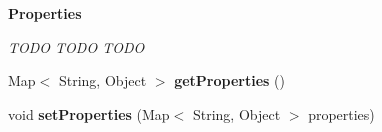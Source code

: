 \begin{Indent}{\bf Properties}\par
{\em \label{_amgrp9fc2d28c05ed9eb1d75ba4465abf15a9}
 TODO TODO TODO }\begin{DoxyCompactItemize}
\item 
\hypertarget{classcom_1_1janrain_1_1android_1_1engage_1_1types_1_1_j_r_activity_object_abbb9f5024dbb91acb1d08f22c11b7661}{
Map$<$ String, Object $>$ {\bfseries getProperties} ()}
\label{classcom_1_1janrain_1_1android_1_1engage_1_1types_1_1_j_r_activity_object_abbb9f5024dbb91acb1d08f22c11b7661}

\item 
\hypertarget{classcom_1_1janrain_1_1android_1_1engage_1_1types_1_1_j_r_activity_object_a6f8bd80cdc8f93045131b5b413170294}{
void {\bfseries setProperties} (Map$<$ String, Object $>$ properties)}
\label{classcom_1_1janrain_1_1android_1_1engage_1_1types_1_1_j_r_activity_object_a6f8bd80cdc8f93045131b5b413170294}

\end{DoxyCompactItemize}
\end{Indent}
